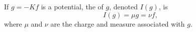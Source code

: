 If $g = -Kf$ is a potential, the  of $g$, denoted $I(g)$, is
$$I(g) = \mu g = \nu f,$$
where $\mu$ and $\nu$ are the charge and measure associated with $g$.
